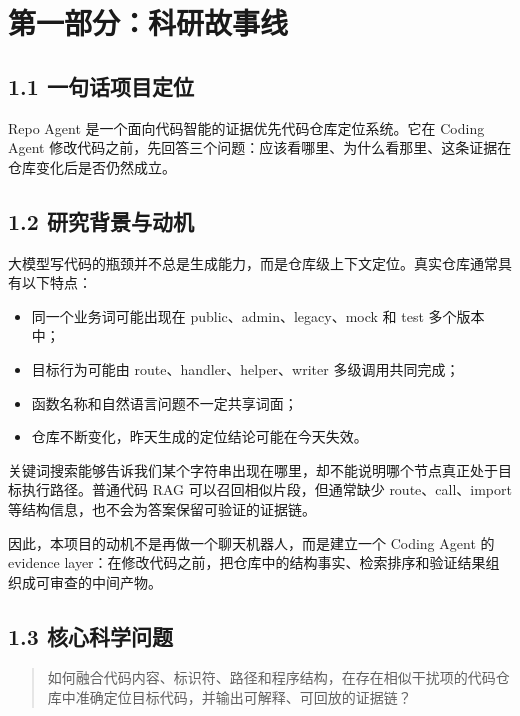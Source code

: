 \documentclass[UTF8,12pt,openany]{ctexbook}
\begin{document}
\clearpage
\chapter{第一部分：科研故事线}

\section{1.1 一句话项目定位}

Repo Agent 是一个面向代码智能的证据优先代码仓库定位系统。它在 Coding Agent 修改代码之前，先回答三个问题：应该看哪里、为什么看那里、这条证据在仓库变化后是否仍然成立。\par

\section{1.2 研究背景与动机}

大模型写代码的瓶颈并不总是生成能力，而是仓库级上下文定位。真实仓库通常具有以下特点：\par

\begin{itemize}
\item 同一个业务词可能出现在 public、admin、legacy、mock 和 test 多个版本中；
\item 目标行为可能由 route、handler、helper、writer 多级调用共同完成；
\item 函数名称和自然语言问题不一定共享词面；
\item 仓库不断变化，昨天生成的定位结论可能在今天失效。
\end{itemize}

关键词搜索能够告诉我们某个字符串出现在哪里，却不能说明哪个节点真正处于目标执行路径。普通代码 RAG 可以召回相似片段，但通常缺少 route、call、import 等结构信息，也不会为答案保留可验证的证据链。\par

因此，本项目的动机不是再做一个聊天机器人，而是建立一个 Coding Agent 的 evidence layer：在修改代码之前，把仓库中的结构事实、检索排序和验证结果组织成可审查的中间产物。\par

\section{1.3 核心科学问题}

\begin{quote}
如何融合代码内容、标识符、路径和程序结构，在存在相似干扰项的代码仓库中准确定位目标代码，并输出可解释、可回放的证据链？
\end{quote}
\end{document}
